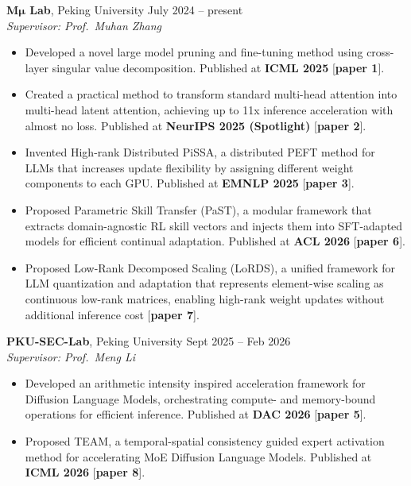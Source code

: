 \documentclass[11pt,a4paper]{article}
\renewcommand{\section}[1]{%
  \vspace{0.9em}%
  \noindent{\large\bfseries\sectionfont\color{headerblue}#1}%
  \vspace{-0.5em}%
  \par\noindent{\color{headerblue}\rule{\textwidth}{0.8pt}}%
  \vspace{0.3em}%
  \par
}
\begin{document}
\noindent
\textbf{M$\bm{\mu}$ Lab}, Peking University \hfill July 2024 -- present\\
\textit{Supervisor: Prof.\ Muhan Zhang}
\begin{itemize}
  \item Developed a novel large model pruning and fine-tuning method using cross-layer singular value decomposition. Published at \textbf{ICML 2025} [\textbf{paper 1}].
  \item Created a practical method to transform standard multi-head attention into multi-head latent attention, achieving up to 11x inference acceleration with almost no loss. Published at \textbf{NeurIPS 2025 (Spotlight)} [\textbf{paper 2}].
  \item Invented High-rank Distributed PiSSA, a distributed PEFT method for LLMs that increases update flexibility by assigning different weight components to each GPU. Published at \textbf{EMNLP 2025} [\textbf{paper 3}].
  \item Proposed Parametric Skill Transfer (PaST), a modular framework that extracts domain-agnostic RL skill vectors and injects them into SFT-adapted models for efficient continual adaptation. Published at \textbf{ACL 2026} [\textbf{paper 6}].
  \item Proposed Low-Rank Decomposed Scaling (LoRDS), a unified framework for LLM quantization and adaptation that represents element-wise scaling as continuous low-rank matrices, enabling high-rank weight updates without additional inference cost [\textbf{paper 7}].
\end{itemize}

\medskip\noindent
\textbf{PKU-SEC-Lab}, Peking University \hfill Sept 2025 -- Feb 2026\\
\textit{Supervisor: Prof.\ Meng Li}
\begin{itemize}
  \item Developed an arithmetic intensity inspired acceleration framework for Diffusion Language Models, orchestrating compute- and memory-bound operations for efficient inference. Published at \textbf{DAC 2026} [\textbf{paper 5}].
  \item Proposed TEAM, a temporal-spatial consistency guided expert activation method for accelerating MoE Diffusion Language Models. Published at \textbf{ICML 2026} [\textbf{paper 8}].
\end{itemize}

\section{Work Experience}
\end{document}
